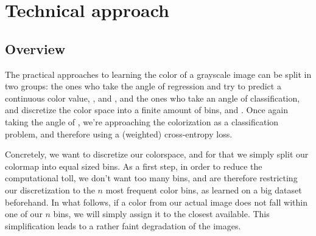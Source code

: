 \documentclass[10pt,twocolumn,letterpaper]{article}
\begin{document}
\section{Technical approach} \label{overview}

\subsection{Overview}


The practical approaches to learning the color of a grayscale image can be split in two groups: the ones who take the angle of regression and try to predict a continuous color value, \eg \cite{cheng2015deep}, \cite{dahl2016tinyclouds} and \cite{deshpande2015learning}, and the ones who take an angle of classification, and discretize the color space into a finite amount of bins, \eg \cite{charpiat2008automatic} and \cite{zhang2016colorful}. Once again taking the angle of \cite{zhang2016colorful}, we're approaching the colorization as a classification problem, and therefore using a (weighted) cross-entropy loss.

Concretely, we want to discretize our colorspace, and for that we simply split our colormap into equal sized bins. As a first step, in order to reduce the computational toll, we don't want too many bins, and are therefore restricting our discretization to the $n$ most frequent color bins, as learned on a big dataset beforehand. In what follows, if a color from our actual image does not fall within one of our $n$ bins, we will simply assign it to the closest available. This simplification leads to a rather faint degradation of the images.
\end{document}
